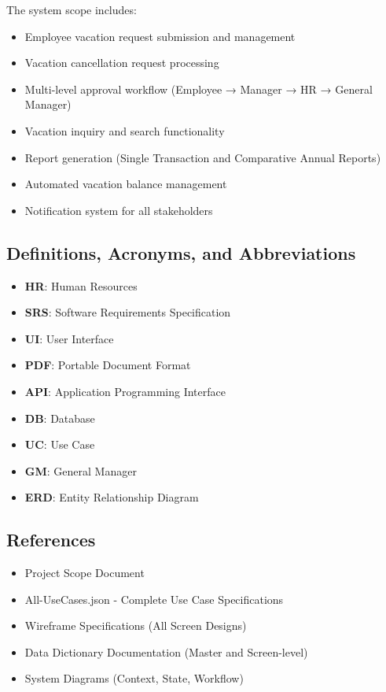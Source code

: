 \documentclass[12pt,a4paper]{article}
\begin{document}
The system scope includes:
\begin{itemize}
    \item Employee vacation request submission and management
    \item Vacation cancellation request processing
    \item Multi-level approval workflow (Employee → Manager → HR → General Manager)
    \item Vacation inquiry and search functionality
    \item Report generation (Single Transaction and Comparative Annual Reports)
    \item Automated vacation balance management
    \item Notification system for all stakeholders
\end{itemize}

\subsection{Definitions, Acronyms, and Abbreviations}
\begin{itemize}
    \item \textbf{HR}: Human Resources
    \item \textbf{SRS}: Software Requirements Specification
    \item \textbf{UI}: User Interface
    \item \textbf{PDF}: Portable Document Format
    \item \textbf{API}: Application Programming Interface
    \item \textbf{DB}: Database
    \item \textbf{UC}: Use Case
    \item \textbf{GM}: General Manager
    \item \textbf{ERD}: Entity Relationship Diagram
\end{itemize}

\subsection{References}
\begin{itemize}
    \item Project Scope Document
    \item All-UseCases.json - Complete Use Case Specifications
    \item Wireframe Specifications (All Screen Designs)
    \item Data Dictionary Documentation (Master and Screen-level)
    \item System Diagrams (Context, State, Workflow)
\end{itemize}
\end{document}
